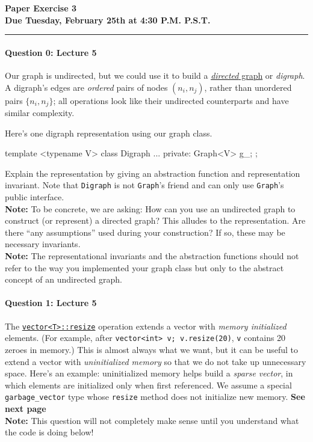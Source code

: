 \documentclass[12pt,letterpaper,twoside]{article}
\begin{document}
{\centering \textbf{Paper Exercise 3\\ Due Tuesday, February 25th at 4:30 P.M. P.S.T. \\}}
\vspace*{-8pt}\noindent\rule{\linewidth}{1pt}

\paragraph{Question 0: Lecture 5} Our graph is undirected, but we could use it to build a
\href{https://en.wikipedia.org/wiki/Directed_graph#Definition}{\emph{directed} graph} or \emph{digraph}. A digraph's edges are \emph{ordered}
pairs of nodes $(n_i, n_j)$, rather than unordered pairs $\{n_i, n_j\}$; all
operations look like their undirected counterparts and have similar complexity.

Here's one digraph representation using our graph class.
\begin{cpp}
template <typename V> 
class Digraph { 
  ... 
 private:
  Graph<V> g_;
};
\end{cpp}
Explain the representation by giving an abstraction function and
representation invariant. Note that \texttt{Digraph} is not
\texttt{Graph}'s friend and can only use \texttt{Graph}'s public
interface. \\

\textbf{Note:} To be concrete, we are asking: How can you use an undirected
graph to construct (or represent) a directed graph? This alludes to
the representation. Are there ``any
assumptions'' used during your construction? If so, these may be
necessary invariants.\\

\textbf{Note: } The representational invariants and the abstraction functions should not refer to the way you implemented your graph class but only to the abstract concept of an undirected graph.

\begin{solution}

\end{solution}

\paragraph{Question 1: Lecture 5} The \href{https://en.cppreference.com/w/cpp/container/vector/resize}{\texttt{vector<T>::resize}} operation extends a vector with
\emph{memory initialized} elements. (For example, after \texttt{vector<int> v;
  v.resize(20)}, \texttt{v} contains 20 zeroes in memory.) This is almost always what we
want, but it can be useful to extend a vector with \emph{uninitialized
  memory} so that we do not take up unnecessary space. Here's an example: uninitialized memory helps build a \emph{sparse
  vector}, in which elements are initialized only when first referenced. We
assume a special \texttt{garbage\_vector} type whose \texttt{resize} method does
not initialize new memory. \textbf{See next page}\\ \textbf{Note:} This question will
not completely make sense until you understand what the code is doing below!
\end{document}
